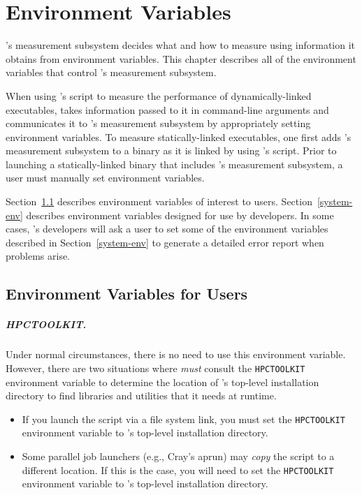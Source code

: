 \newcommand{\parg}{\vspace{1ex}\noindent}

\chapter{Environment Variables}
\label{sec:env}

\HPCToolkit{}'s measurement subsystem decides what and how to measure
using information it obtains from environment variables.  
This chapter describes all of the environment variables that control
\HPCToolkit's measurement subsystem. 

When using
\HPCToolkit{}'s \hpcrun{} script to measure the performance of
dynamically-linked executables, \hpcrun{} takes information passed
to it in command-line arguments and communicates it to \HPCToolkit{}'s
measurement subsystem by appropriately setting environment variables.
To measure statically-linked executables, one first adds \HPCToolkit's
measurement subsystem to a binary as it is linked by using \HPCToolkit's
\hpclink{} script. Prior to launching a statically-linked binary that
includes \HPCToolkit's measurement subsystem, a user 
must manually set environment variables.

Section~\ref{user-env} describes
environment variables of interest to users. Section~\ref{system-env}
describes environment variables designed for use by \HPCToolkit{}
developers. In some cases, \HPCToolkit's developers will ask a user
to set some of the environment variables described in Section~\ref{system-env} to generate a detailed error 
report when problems arise.

\section{Environment Variables for Users}
\label{user-env}

\paragraph{HPCTOOLKIT.}
Under normal circumstances, there is no need to use this environment variable. 
However, there are two situations where \hpcrun{}
\emph{must} consult the \verb+HPCTOOLKIT+ environment variable to determine the location
of \HPCToolkit{}'s top-level installation directory to find libraries
and utilities that it needs at runtime.

\begin{itemize}
\item
       If you launch the \hpcrun{} script via a file system link,
       you must set the \verb+HPCTOOLKIT+ environment variable to
       \HPCToolkit{}'s top-level installation directory.
\item Some parallel job launchers (e.g., Cray's aprun) may \emph{copy} the
       \hpcrun{} script to a different location. If this is the case, you will need to set the \verb+HPCTOOLKIT+ environment variable to
       \HPCToolkit{}'s top-level installation directory.

\end{itemize}

